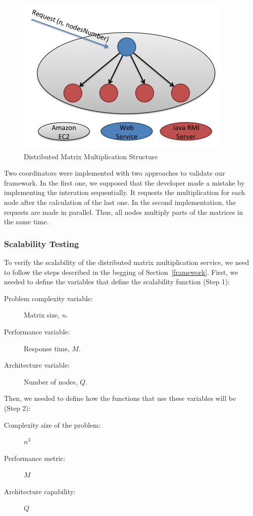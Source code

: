\begin{figure}[htbp]
\begin{center}
	\includegraphics[scale=0.6]{images/dmm}
\caption{Distributed Matrix Multiplication Structure}
\label{dmm}
\end{center}
\end{figure}

Two coordinators were implemented with two approaches to validate our framework. In the first one, we supposed that the developer made a mistake by implementing the interation sequentially. It requests the multiplication for each node after the calculation of the last one. In the second implementation, the requests are made in parallel. Thus, all nodes multiply parts of the matrices in the same time.

\subsubsection{Scalability Testing}
To verify the scalability of the distributed matrix multiplication service, we need to follow the steps described in the begging of Section~\ref{framework}. First, we needed to define the variables that define the scalability function (Step 1):
\begin{description}
\item[Problem complexity variable: ] Matrix size, $n$.
\item[Performance variable: ]  Response time, $M$.
\item[Architecture variable: ] Number of nodes, $Q$.
\end{description}

Then, we needed to define how the functions that use these variables will be (Step 2):
\begin{description}
\item[Complexity size of the problem: ] $n^3$
\item[Performance metric: ]  $M$ 
\item[Architecture capability: ] $Q$
\end{description}

